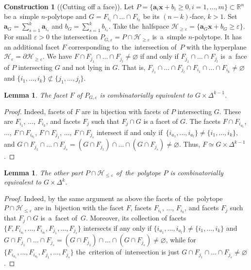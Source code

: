 \documentclass[12pt]{amsart}
\newtheorem{lemma}[formula]{Lemma}
\theoremstyle{definition}
\newtheorem{construction}[formula]{Construction}
\theoremstyle{remark}
\begin{document}
\begin{construction}[(Cutting off a face)]\label{con:cutF}
Let $P=\{\boldsymbol{a}_i\boldsymbol{x}+b_i\geqslant 0, i=1,\dots,m\}\subset \mathbb R^n$ be 
a~simple $n$-polytope and $G=F_{i_1}\cap\dots\cap F_{i_k}$ be its $(n-k)$-face, $k>1$.
Set $\boldsymbol{a}_G=\sum\limits_{s=1}^k\boldsymbol{a}_{i_s}$ and $b_G=\sum\limits_{s=1}^kb_{i_s}$.
Take the~halfspace $\mathcal{H}_{\geqslant \varepsilon}=\{\boldsymbol{a}_G\boldsymbol{x}+
b_G\geqslant \varepsilon\}$.
For small $\varepsilon>0$ the intersection $P_{G,\varepsilon}=P\cap \mathcal{H}_{\geqslant \varepsilon}$
is~a~simple $n$-polytope. It has an additional facet $F$ corresponding 
to~the~intersection of~$P$ with the hyperplane 
$\mathcal{H}_{\varepsilon}=\partial \mathcal{H}_{\geqslant \varepsilon}$.
We have $F\cap F_{j_1}\cap\dots\cap F_{j_l}\ne\varnothing$ if and only if $F_{j_1}\cap\dots\cap F_{j_l}$ 
is~a~face of $P$ intersecting $G$ and not lying in $G$.  That is, 
$F_{j_1}\cap\dots\cap F_{j_l}\cap F_{i_1}\cap\dots\cap F_{i_k}\ne\varnothing$ and $\{i_1,\dots,i_k\}\not\subset\{j_1,\dots,j_l\}$. 
\end{construction}
\begin{lemma}
The facet $F$ of $P_{G,\varepsilon}$ 
is combinatorially equivalent to $G\times \Delta^{k-1}$.
\end{lemma}
\begin{proof} 
Indeed, facets of $F$ are in bijection with
facets of $P$ intersecting $G$. These are $F_{i_1}$, $\dots$, $F_{i_k}$, and facets $F_j$ such that $F_j\cap G$
is a facet of $G$. The facets $F\cap F_{i_{a_1}}$, $\dots$, $F\cap F_{i_{a_l}}$, $F\cap F_{j_1}$, $\dots$, $F\cap F_{j_s}$ intersect
if and only if~$\{i_{a_1},\dots, i_{a_l}\}\ne \{i_1,\dots, i_k\}$, and 
$G\cap F_{j_1}\cap \dots\cap F_{j_s}=(G\cap F_{j_1})\cap\dots\cap (G\cap F_{j_s})\ne\varnothing$. Thus, 
$F\simeq G\times\Delta^{k-1}$.
\end{proof}
\begin{lemma}\label{lem:Ppart}
The other part $P\cap \mathcal{H}_{\leqslant \varepsilon}$ of~the~polytope $P$ 
is combinatorially equivalent to $G\times\Delta^k$. 
\end{lemma}
\begin{proof}
Indeed, by the same argument as above the facets of~the~polytope $P\cap \mathcal{H}_{\leqslant \varepsilon}$
are in~bijection with the facet $F$,  facets $F_{i_1}$, $\dots$, $F_{i_k}$, and facets $F_j$ such that $F_j\cap G$
is~a~facet of~$G$. Moreover, its collection of facets 
 $\{F, F_{i_{a_1}}, \dots, F_{i_{a_l}}, F_{j_1},\dots, F_{j_s}\}$ 
intersects if any only if $\{i_{a_1},\dots, i_{a_l}\}\ne \{i_1,\dots, i_k\}$ and $G\cap F_{j_1}\cap \dots\cap F_{j_s}=(G\cap F_{j_1})\cap\dots\cap (G\cap F_{j_s})\ne\varnothing$,
while for $\{F_{i_{a_1}}, \dots, F_{i_{a_l}}, F_{j_1},\dots, F_{j_s}\}$ the~criterion of~intersection 
is just $G\cap F_{j_1}\cap \dots\cap F_{j_s}\ne\varnothing$.
\end{proof}
\end{document}
